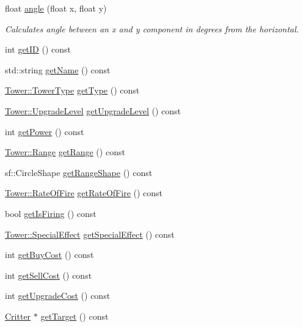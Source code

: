 \begin{DoxyCompactItemize}
float \hyperlink{class_tower_ac73968b76cfd64ae3d5c7d3300ec9935}{angle} (float x, float y)
\begin{DoxyCompactList}\small\item\em Calculates angle between an x and y component in degrees from the horizontal. \end{DoxyCompactList}\item 
int \hyperlink{class_tower_abe79d42828ca9c8ba4b60263e566697f}{get\+I\+D} () const 
\item 
std\+::string \hyperlink{class_tower_ad830cdd9f1870479b5763b7ee9c33c8d}{get\+Name} () const 
\item 
\hyperlink{class_tower_a110a21c18d4ec095c6234bd17f004b3e}{Tower\+::\+Tower\+Type} \hyperlink{class_tower_a87db306927fd4022cae1369b88688ed7}{get\+Type} () const 
\item 
\hyperlink{class_tower_a23889cd9ee2fbae0420c97105fd6ebc8}{Tower\+::\+Upgrade\+Level} \hyperlink{class_tower_ae8236cf1fac3f2fd791312e3dc59d904}{get\+Upgrade\+Level} () const 
\item 
int \hyperlink{class_tower_a198af6f04dad766d019b72fc667b90a7}{get\+Power} () const 
\item 
\hyperlink{class_tower_a52bcc3e7f85c01b3105e919717503169}{Tower\+::\+Range} \hyperlink{class_tower_ab33ee35d8f02b8961a8fb7697e5e9cea}{get\+Range} () const 
\item 
sf\+::\+Circle\+Shape \hyperlink{class_tower_a829a95b9dc022cc07ecd4d5c0afa7260}{get\+Range\+Shape} () const 
\item 
\hyperlink{class_tower_ae82ae8201f8921eb64878d2c9ecb5bb2}{Tower\+::\+Rate\+Of\+Fire} \hyperlink{class_tower_acf53d0a9123761730bd3e737a5b5a854}{get\+Rate\+Of\+Fire} () const 
\item 
bool \hyperlink{class_tower_a488db197289e0850f573310a13cfecef}{get\+Is\+Firing} () const 
\item 
\hyperlink{class_tower_a355ab1cbcfd8c4d037ccf8937f784445}{Tower\+::\+Special\+Effect} \hyperlink{class_tower_a9ef4f0f087f1bc09fe0e4e30e44ca6a5}{get\+Special\+Effect} () const 
\item 
int \hyperlink{class_tower_af2bb341e8011c2526ad5c58e11d79b28}{get\+Buy\+Cost} () const 
\item 
int \hyperlink{class_tower_adae75d4203ca7c3a92da1fe367d64bac}{get\+Sell\+Cost} () const 
\item 
int \hyperlink{class_tower_a6211c9d5d2718c1d65efb0b636e74d77}{get\+Upgrade\+Cost} () const 
\item 
\hyperlink{class_critter}{Critter} $\ast$ \hyperlink{class_tower_ad5d042b8ab67fdcae27ecbd82fb27b0c}{get\+Target} () const 

\end{DoxyCompactItemize}

